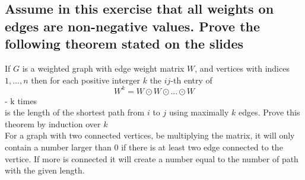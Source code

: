 \documentclass[12pt, a4paper]{article}
\begin{document}
	\subsection{Assume in this exercise that all weights on edges are non-negative values. Prove the following theorem stated on the slides}
		If $G$ is a weighted graph with edge weight matrix $W$, and vertices with indices $1,...,n$ then for each positive interger $k$ the $ij$-th entry of\\
		$$W^k=W\odot W\odot ... \odot W$$ - k times\\
		is the length of the shortest path from $i$ to $j$ using maximally $k$ edges. Prove this theorem by induction over $k$\\
		For a graph with two connected vertices, be multiplying the matrix, it will only contain a number larger than 0 if there is at least two edge connected to the vertice. If more is connected it will create a number equal to the number of path with the given length.
		
		

			

		
\end{document}

